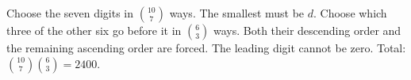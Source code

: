 Choose the seven digits in $\binom{10}{7}$ ways. The smallest must be $d$. Choose which three of the other six go before it in $\binom63$ ways. Both their descending order and the remaining ascending order are forced. The leading digit cannot be zero. Total: $\binom{10}{7}\binom63=\boxed{2400}$.
